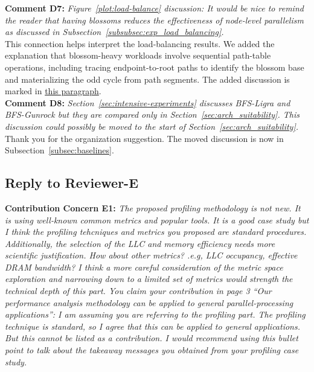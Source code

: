 \noindent\textbf{Comment D7:} \textit{Figure~\ref{plot:load-balance} discussion: It would be nice to remind the reader that having blossoms reduces the effectiveness of node-level parallelism as discussed in Subsection~\ref{subsubsec:exp_load_balancing}.}
\\

\noindent This connection helps interpret the load-balancing results. We added the explanation that blossom-heavy workloads involve sequential path-table operations, including tracing endpoint-to-root paths to identify the blossom base and materializing the odd cycle from path segments. The added discussion is marked in \hyperref[para:blossom-node-level-limitation]{this paragraph}.
\\

\noindent\textbf{Comment D8:} \textit{Section~\ref{sec:intensive-experiments} discusses BFS-Ligra and BFS-Gunrock but they are compared only in Section~\ref{sec:arch_suitability}. This discussion could possibly be moved to the start of Section~\ref{sec:arch_suitability}.}
\\

\noindent Thank you for the organization suggestion. The moved discussion is now in Subsection~\ref{subsec:baselines}.
\\

\subsection{Reply to Reviewer-E}

\noindent\textbf{Contribution Concern E1:} \textit{The proposed profiling methodology is not new. It is using well-known common metrics and popular tools. It is a good case study but I think the profiling tehcniques and metrics you proposed are standard procedures. Additionally, the selection of the LLC and memory efficiency needs more scientific justification. How about other metrics? .e.g, LLC occupancy, effective DRAM bandwidth? I think a more careful consideration of the metric space exploration and narrowing down to a limited set of metrics would strength the technical depth of this part.
You claim your contribution in page 3 ``Our performance analysis methodology can be applied to general parallel-processing applications'': I am assuming you are referring to the profiling part. The profiling technique is standard, so I agree that this can be applied to general applications. But this cannot be listed as a contribution. I would recommend using this bullet point to talk about the takeaway messages you obtained from your profiling case study.}
\\

